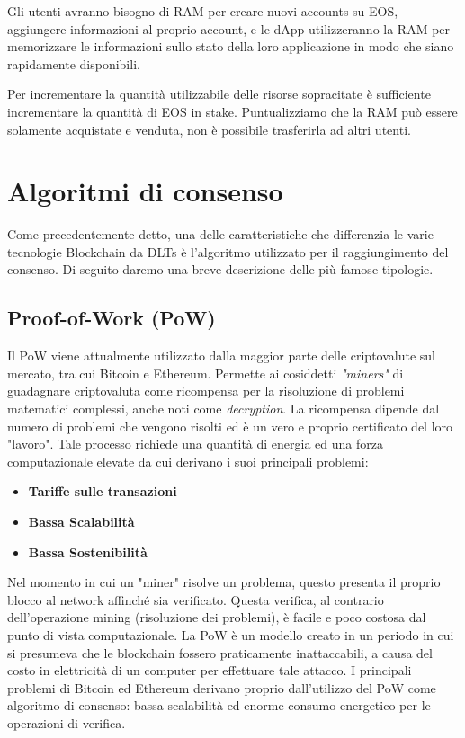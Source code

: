 Gli utenti avranno bisogno di RAM per creare nuovi accounts su EOS, aggiungere informazioni al proprio account, e le dApp utilizzeranno la RAM per memorizzare le informazioni sullo stato della loro applicazione in modo che siano rapidamente disponibili. 

Per incrementare la quantità utilizzabile delle risorse sopracitate è sufficiente incrementare la quantità di EOS in stake. Puntualizziamo che la RAM può essere solamente acquistate e venduta, non è possibile trasferirla ad altri utenti.

\section{Algoritmi di consenso}
Come precedentemente detto, una delle caratteristiche che differenzia le varie tecnologie Blockchain da DLTs è l'algoritmo utilizzato per il raggiungimento del consenso. Di seguito daremo una breve descrizione delle più famose tipologie.

\subsection{Proof-of-Work (PoW)}
\label{pow_marker}
Il PoW \cite{pisanu2019Ethereum,vitale2018DPOS,ZHANG202093} viene attualmente utilizzato dalla maggior parte delle criptovalute sul mercato, tra cui Bitcoin e Ethereum. Permette ai cosiddetti \textit{"miners"} di guadagnare criptovaluta come ricompensa per la risoluzione di problemi matematici complessi, anche noti come \textit{decryption}. La ricompensa dipende dal numero di problemi che vengono risolti ed è un vero e proprio certificato del loro "lavoro". 
Tale processo richiede una quantità di energia ed una forza computazionale elevate da cui derivano i suoi principali problemi:

\begin{itemize}
    \item \textbf{Tariffe sulle transazioni}
    \item \textbf{Bassa Scalabilità}
    \item \textbf{Bassa Sostenibilità}
\end{itemize}

Nel momento in cui un "miner" risolve un problema, questo presenta il proprio blocco al network affinché sia verificato. Questa verifica, al contrario dell'operazione mining (risoluzione dei problemi), è facile e poco costosa dal punto di vista computazionale.
La PoW è un modello creato in un periodo in cui si presumeva che le blockchain fossero praticamente inattaccabili, a causa del costo in elettricità di un computer per effettuare tale attacco. I principali problemi di Bitcoin ed Ethereum derivano proprio dall'utilizzo del PoW come algoritmo di consenso: bassa scalabilità ed enorme consumo energetico per le operazioni di verifica.

